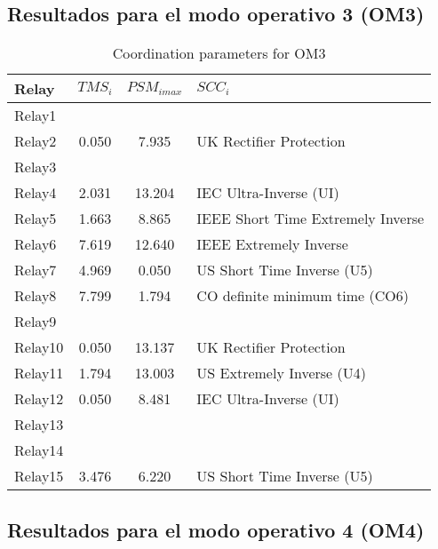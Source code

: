 \documentclass[journal,article,submit,pdftex,moreauthors]{Definitions/mdpi}
\begin{document}
\subsection{Resultados para el modo operativo 3 (OM3)}



\begin{table}[H]
\caption{Coordination parameters for OM3}
\label{tablaDialOM3}
\centering
\begin{tabular}{lccl}
\toprule
\textbf{Relay }	& \textbf{ $TMS_i$} &     \textbf{ $PSM_{imax}$} & \textbf{$SCC_i$}\\
\midrule
Relay1 &  &  &  \\ 
Relay2 & 0.050 & 7.935 & UK Rectifier Protection \\
Relay3 &  &  &  \\ 
Relay4 & 2.031 & 13.204 & IEC Ultra-Inverse (UI) \\
Relay5 & 1.663 & 8.865 & IEEE Short Time Extremely Inverse \\
Relay6 & 7.619 & 12.640 & IEEE Extremely Inverse \\
Relay7 & 4.969 & 0.050 & US Short Time Inverse (U5) \\
Relay8 & 7.799 & 1.794 & CO definite minimum time (CO6) \\
Relay9 &  &  &  \\ 
Relay10 & 0.050 & 13.137 & UK Rectifier Protection \\
Relay11 & 1.794 & 13.003 & US Extremely Inverse (U4) \\
Relay12 & 0.050 & 8.481 & IEC Ultra-Inverse (UI) \\
Relay13 &  &  &  \\ 
Relay14 &  &  &  \\ 
Relay15 & 3.476 & 6.220 & US Short Time Inverse (U5) \\
\bottomrule
\end{tabular}
\end{table}


\subsection{Resultados para el modo operativo 4 (OM4)}
\end{document}
